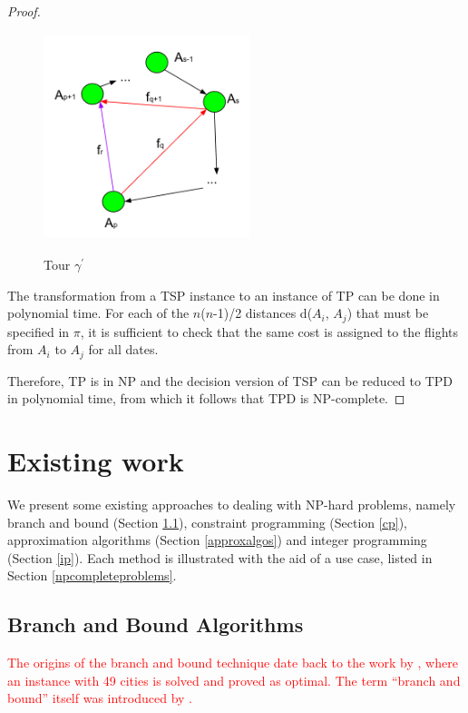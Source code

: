 \documentclass{article}
\theoremstyle{definition}
\begin{document}
\begin{proof}
\begin{figure}
\centering
\includegraphics[width=6cm, height=6cm]{images/routes.png}
\label{fig:routes}
\caption{Tour $\gamma^{\prime}$}
\end{figure}

The transformation from a TSP instance to an instance of TP can be done in polynomial time. For each of the $n$($n$-1)/2 distances d($A_{i}$, $A_{j}$) that must be specified in $\pi$, it is sufficient to check that the same cost is assigned to the flights from $A_{i}$ to $A_{j}$ for all dates.

Therefore, TP is in NP and the decision version of TSP can be reduced to TPD in polynomial time, from which it follows that TPD is NP-complete.

\end{proof}

\section{Existing work}
\label{sec:existingwork}
We present some existing approaches to dealing with NP-hard problems, namely branch and bound (Section \ref{branchandbound}), constraint programming (Section \ref{cp}), approximation algorithms (Section \ref{approxalgos}) and integer programming (Section \ref{ip}). Each method is illustrated with the aid of a use case, listed in Section \ref{npcompleteproblems}.

\subsection{Branch and Bound Algorithms}
\label{branchandbound}
\textcolor{red}{
The origins of the branch and bound technique date back to the work by \citet{Dantzig54}, where an instance with 49 cities is solved and proved as optimal. The term ``branch and bound'' itself was introduced by \citet{Little63}.} 
\end{document}
